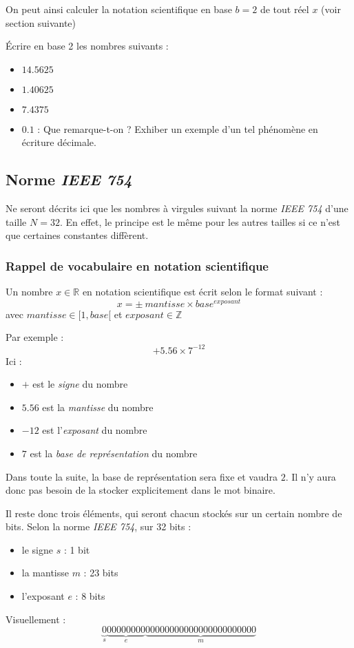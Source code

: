 \documentclass[../../main.tex]{subfiles}
\begin{document}
On peut ainsi calculer la notation scientifique en base $b = 2$ de tout réel $x$ (voir section suivante)

 Écrire en base 2 les nombres suivants :
\begin{itemize}
     \item $14.5625$
     \item $1.40625$
     \item $7.4375$
     \item $0.1$ : Que remarque-t-on ? Exhiber un exemple d'un tel phénomène en écriture décimale.
\end{itemize} 
\subsection{Norme \textit{IEEE 754}}
Ne seront décrits ici que les nombres à virgules suivant la norme \textit{IEEE 754} d'une taille $N = 32$. En effet, le principe est le même pour les autres tailles si ce n'est que certaines constantes diffèrent.

\subsubsection{Rappel de vocabulaire en notation scientifique}
Un nombre $x\in{\mathbb{R}}$ en notation scientifique est écrit selon le format suivant :
$$x = \pm\ mantisse \times{base^{exposant}}$$
avec $mantisse\in{[1, base[}$ et $exposant\in{\mathbb{Z}}$

Par exemple :
$$+ 5.56\times{7^{-12}}$$
Ici :
\begin{itemize}
     \item $+$ est le \textit{signe} du nombre
     \item $5.56$ est la \textit{mantisse} du nombre
     \item $-12$ est l'\textit{exposant} du nombre
     \item $7$ est la \textit{base de représentation} du nombre
\end{itemize}
Dans toute la suite, la base de représentation sera fixe et vaudra $2$. Il n'y aura donc pas besoin de la stocker explicitement dans le mot binaire.

Il reste donc trois éléments, qui seront chacun stockés sur un certain nombre de bits. \newline
Selon la norme \textit{IEEE 754}, sur 32 bits :
\begin{itemize}
     \item le signe $s$ : 1 bit
     \item la mantisse $m$ : 23 bits
     \item l'exposant $e$ : 8 bits
\end{itemize}
Visuellement :
$$\underbrace{0}_{s}\underbrace{00000000}_{e}\underbrace{00000000000000000000000}_{m}$$
\end{document}
